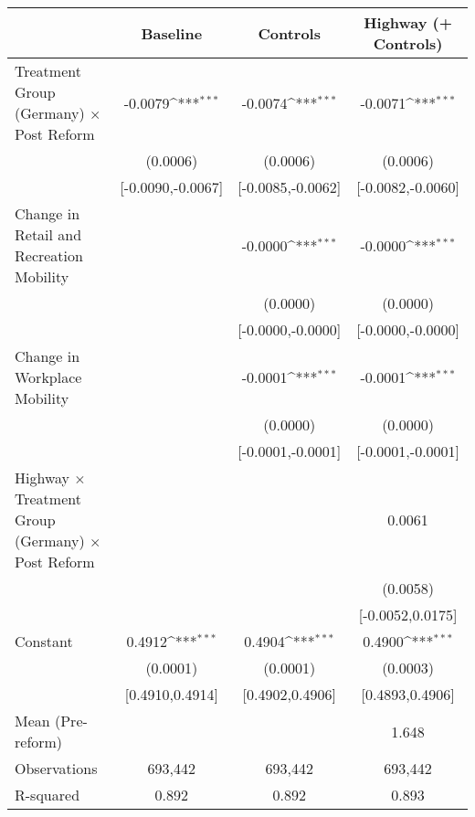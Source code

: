 {
\def\sym#1{\ifmmode^{#1}\else\(^{#1}\)\fi}
\begin{tabular}{l*{3}{c}}
\toprule
                    &\multicolumn{1}{c}{Baseline}&\multicolumn{1}{c}{Controls}&\multicolumn{1}{c}{Highway (+ Controls)}\\
\midrule
Treatment Group (Germany) $\times$ Post Reform&     -0.0079\sym{***}&     -0.0074\sym{***}&     -0.0071\sym{***}\\
                    &    (0.0006)         &    (0.0006)         &    (0.0006)         \\
                    &[-0.0090,-0.0067]         &[-0.0085,-0.0062]         &[-0.0082,-0.0060]         \\
Change in Retail and Recreation Mobility&                     &     -0.0000\sym{***}&     -0.0000\sym{***}\\
                    &                     &    (0.0000)         &    (0.0000)         \\
                    &                     &[-0.0000,-0.0000]         &[-0.0000,-0.0000]         \\
Change in Workplace Mobility&                     &     -0.0001\sym{***}&     -0.0001\sym{***}\\
                    &                     &    (0.0000)         &    (0.0000)         \\
                    &                     &[-0.0001,-0.0001]         &[-0.0001,-0.0001]         \\
Highway $\times$ Treatment Group (Germany) $\times$ Post Reform&                     &                     &      0.0061         \\
                    &                     &                     &    (0.0058)         \\
                    &                     &                     &[-0.0052,0.0175]         \\
Constant            &      0.4912\sym{***}&      0.4904\sym{***}&      0.4900\sym{***}\\
                    &    (0.0001)         &    (0.0001)         &    (0.0003)         \\
                    &[0.4910,0.4914]         &[0.4902,0.4906]         &[0.4893,0.4906]         \\
\midrule
Mean (Pre-reform)   &                     &                     &       1.648         \\
Observations        &     693,442         &     693,442         &     693,442         \\
R-squared           &       0.892         &       0.892         &       0.893         \\
\bottomrule
\end{tabular}
}
